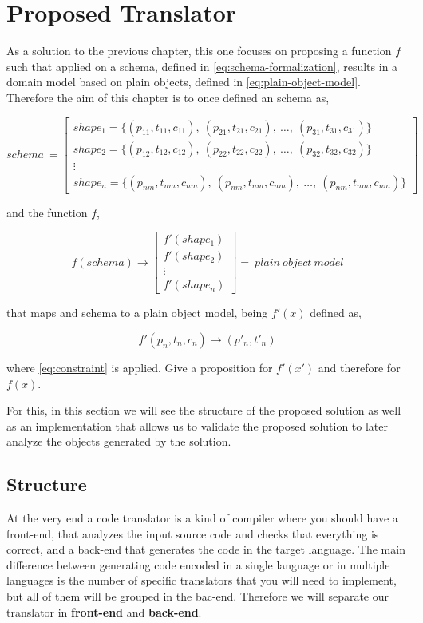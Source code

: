 \chapter{Proposed Translator}
\label{ch:proposed-system}
As a solution to the previous chapter, this one focuses on proposing a function $f$ such that applied on a
schema, defined in \cref{eq:schema-formalization}, results in a domain model based on plain objects,
defined in \cref{eq:plain-object-model}. Therefore the aim of this chapter is to once defined an schema as,

\begin{equation}
schema\ =\begin{bmatrix}shape_1=\{(p_{11},t_{11},c_{11}),\ (p_{21},t_{21},c_{21}),\ \dots,\ (p_{31},t_{31},c_{31})\}
\\ shape_2=\{(p_{12},t_{12},c_{12}),\ (p_{22},t_{22},c_{22}),\ \dots,\ (p_{32},t_{32},c_{32})\}
\\ \vdots
\\ shape_n=\{(p_{nm},t_{nm},c_{nm}),\ (p_{nm},t_{nm},c_{nm}),\ \dots,\ (p_{nm},t_{nm},c_{nm})\}
\end{bmatrix}
\end{equation}

and the function $f$,

\begin{equation}
f(schema)\rightarrow
\begin{bmatrix}f'(shape_1)
\\ f'(shape_2)
\\ \vdots
\\ f'(shape_n)
\end{bmatrix}
=\ plain\ object\ model
\end{equation}

that maps and schema to a plain object model, being $f'(x)$ defined as,

\begin{equation}
	f'(p_n,t_n,c_n) \rightarrow (p'_n,t'_n)
\end{equation}

where \cref{eq:constraint} is applied. Give a proposition for $f'(x')$ and therefore for $f(x)$.

For this, in this section we will see the structure of the proposed solution as well as an implementation
that allows us to validate the proposed solution to later analyze the objects generated by the solution.

\section{Structure}
At the very end a code translator is a kind of compiler where you should have a front-end, that
analyzes the input source code and checks that everything is correct, and a back-end that
generates the code in the target language. The main difference between generating code encoded
in a single language or in multiple languages is the number of specific translators that you will need to
implement, but all of them will be grouped in the bac-end. Therefore we will separate our
translator in \textbf{front-end} and \textbf{back-end}.

